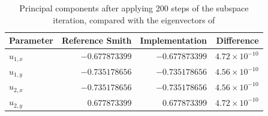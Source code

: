 \begin{table}[H]
    \centering
    \begin{tabular}{lrrr}
        \toprule
        Parameter & Reference Smith& Implementation & Difference \\
        \midrule
        $u_{1,x}$ & $-0.677873399$ & $-0.677873399$ & $4.72 \times 10^{-10}$ \\
        $u_{1,y}$ & $-0.735178656$ & $-0.735178656$ & $4.56 \times 10^{-10}$ \\
        $u_{2,x}$ & $-0.735178656$ & $-0.735178656$ & $4.56 \times 10^{-10}$ \\
        $u_{2,y}$ &  $0.677873399$ &  $0.677873399$ & $4.72 \times 10^{-10}$ \\
        \bottomrule
    \end{tabular}
    \caption{Principal components after applying 200 steps of the subspace iteration, compared with the
    eigenvectors of \citet{CheckForCorectness}}
    \label{tab:CheckEigenvectors}
\end{table}

